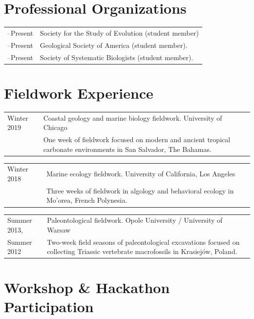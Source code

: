 \documentclass[10pt]{article}
\begin{document}
\section*{Professional Organizations}

\begin{tabularx}{\textwidth}{>{\raggedleft\arraybackslash}p{2.2cm} X}
2023--Present & Society for the Study of Evolution (student member) \\[0.1cm]
2022--Present & Geological Society of America (student member). \\[0.1cm]
2017--Present & Society of Systematic Biologists (student member).
\end{tabularx}

\section*{Fieldwork Experience}

\begin{tabularx}{\textwidth}{>{\raggedleft\arraybackslash}p{2.2cm} X}
Winter 2019 & Coastal geology and marine biology fieldwork. University of Chicago \\
& One week of fieldwork focused on modern and ancient tropical carbonate environments in San Salvador, The Bahamas.
\end{tabularx}
\begin{tabularx}{\textwidth}{>{\raggedleft\arraybackslash}p{2.2cm} X}
Winter 2018 & Marine ecology fieldwork. University of California, Los Angeles \\
& Three weeks of fieldwork in algology and behavioral ecology in Mo'orea, French Polynesia.
\end{tabularx}
\begin{tabularx}{\textwidth}{>{\raggedleft\arraybackslash}p{2.2cm} X}
Summer 2013, & Paleontological fieldwork. Opole University / University of Warsaw \\
Summer 2012 & Two-week field seasons of paleontological excavations focused on collecting Triassic vertebrate macrofossils in Krasiej\'{o}w, Poland.
\end{tabularx}

\section*{Workshop \& Hackathon Participation}
\end{document}
